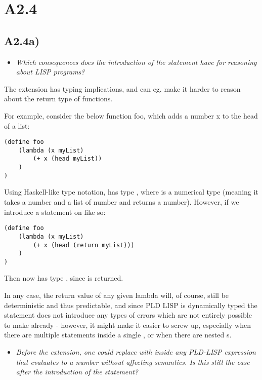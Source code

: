 \newpage
\section{A2.4}
\subsection{A2.4a)}

\begin{itemize}
  \item \emph{Which consequences does the introduction of the 
    statement have for reasoning about LISP programs?}
\end{itemize}


The extension has typing implications, and can eg. make it harder to reason
about the return type of functions.

\medskip

For example, consider the below function foo, which adds a number x to the head of a list:

\begin{verbatim}
(define foo
    (lambda (x myList)
        (+ x (head myList))
    )
)      
\end{verbatim}

Using Haskell-like type notation,  has type ,
where  is a numerical type (meaning it takes a number and a list of
number and returns a number). However, if we introduce a  statement
on  like so:

\begin{verbatim}
(define foo
    (lambda (x myList)
        (+ x (head (return myList)))
    )
)      
\end{verbatim}

Then  now has type , since  is returned.

\smallskip

In any case, the return value of any given lambda will, of course, still be
deterministic and thus predictable, and since PLD LISP is dynamically typed the
 statement does not introduce any types of errors which are not
entirely possible to make already - however, it might make it easier to screw
up, especially when there are multiple  statements inside a single
, or when there are nested s.

\newpage
\begin{itemize}
\item \emph{Before the extension, one could replace  with  inside any PLD-LISP expression that evaluates to a number without
    affecting semantics. Is this still the case after the introduction of the
     statement?}
\end{itemize}

